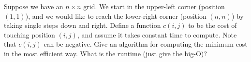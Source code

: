 \item {}

Suppose we have an $n\times n$ grid. We start in the upper-left corner (position
$(1,1)$), and we would like to reach the lower-right corner (position $(n,n)$)
by taking single steps down and right. Define a function $c(i, j)$ to be the
cost of touching position $(i, j)$, and assume it takes constant time to
compute. Note that $c(i, j)$ can be negative. Give an algorithm for computing
the minimum cost in the most efficient way. What is the runtime (just give the
big-O)?
